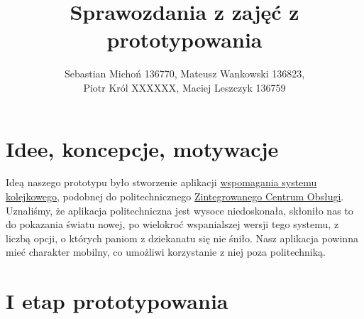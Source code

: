 \documentclass[12pt]{article}
\begin{document}
\title{Sprawozdania z zajęć z prototypowania}
\author{Sebastian Michoń 136770, Mateusz Wankowski 136823,\\ Piotr Król XXXXXX, Maciej Leszczyk 136759}
\date{\vspace{-3ex}}
\maketitle

\section{Idee, koncepcje, motywacje}
Ideą naszego prototypu było stworzenie aplikacji \underline{wspomagania systemu kolejkowego}, podobnej do politechnicznego \underline{Zintegrowanego Centrum Obsługi}. Uznaliśmy, że aplikacja politechniczna jest wysoce niedoskonała, skłoniło nas to do pokazania światu nowej, po wielokroć wspanialszej wersji tego systemu, z liczbą opcji, o których paniom z dziekanatu się nie śniło. Nasz aplikacja powinna mieć charakter mobilny, co umożliwi korzystanie z niej poza politechniką.

\section{I etap prototypowania}
\end{document}
